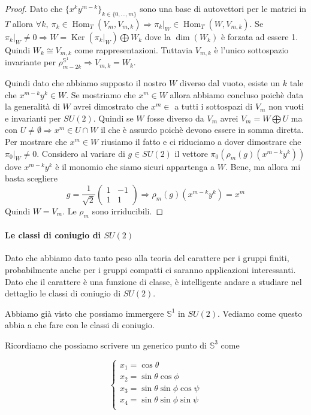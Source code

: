 \documentclass[11pt]{article}
\theoremstyle{plain}
\theoremstyle{definition}
\theoremstyle{remark}
\DeclareMathOperator{\Hom}{Hom}
\DeclareMathOperator{\Ker}{Ker}
\begin{document}
\begin{proof}
Dato che  $\{ x^ky^{m-k} \}_{k \in \{0, ..., m\}}$ sono una base di autovettori per le matrici in $T$ allora $\forall k,\ \pi_k\in \Hom_T(V_m,V_{m,k} )\Rightarrow \pi_k|_W\in \Hom_T(W,V_{m,k})$. Se $\pi_k|_W\neq 0\Rightarrow W=\Ker(\pi_k|_W)\bigoplus W_k$ dove la $\dim(W_k)$ è forzata ad essere 1. Quindi $W_k\cong V_{m,k}$ come rappresentazioni. Tuttavia $V_{m,k}$ è l'unico sottospazio invariante per $\rho_{m-2k}^{\mathbb{S}^1}\Rightarrow V_{m,k}=W_k$.


Quindi dato che abbiamo supposto il nostro $W$ diverso dal vuoto, esiste un $k$ tale che $x^{m-k}y^k\in W$. Se mostriamo che $x^m\in W$ allora abbiamo concluso poichè data la generalità di $W$ avrei dimostrato che $x^m\in$ a tutti i sottospazi di $V_m$ non vuoti e invarianti per $SU(2)$. Quindi se $W$ fosse diverso da $V_m$ avrei $V_m=W\bigoplus U$ ma con $U\neq \emptyset \Rightarrow x^m\in U\cap W$ il che è assurdo poichè devono essere in somma diretta. Per mostrare che $x^m\in W$ riusiamo il fatto e ci riduciamo a dover dimostrare che $\pi_0|_W\neq 0$. Considero al variare di $g\in SU(2)$ il vettore $\pi_0(\rho_m(g)(x^{m-k}y^k))$ dove $x^{m-k}y^k$ è il monomio che siamo sicuri appartenga a $W$. Bene, ma allora mi basta scegliere
\[g=\frac{1}{\sqrt{2}}\begin{pmatrix}
1& -1\\
 1& 1
\end{pmatrix}\Rightarrow \rho_m(g)(x^{m-k}y^k)=x^m\]
Quindi $W=V_m$. Le $\rho_m$ sono irriducibili.
\end{proof}




 \paragraph{Le classi di coniugio di $SU(2)$}
 Dato che abbiamo dato tanto peso alla teoria del carattere per i gruppi finiti, probabilmente anche per i gruppi compatti ci saranno applicazioni interessanti. Dato che il carattere è una funzione di classe, è intelligente andare a studiare nel dettaglio le classi di coniugio di $SU(2)$.


 Abbiamo già visto che possiamo immergere $\mathbb{S}^1$ in $SU(2)$. Vediamo come questo abbia a che fare con le classi di coniugio.


 Ricordiamo che possiamo scrivere un generico punto di $\mathbb{S}^3$ come

 \[
 \begin{cases}
 x_1 = \cos\theta \\
 x_2 = \sin\theta\cos\phi \\
 x_3 = \sin\theta\sin\phi\cos\psi \\
 x_4 = \sin\theta\sin\phi\sin\psi \\
 \end{cases}
 \]
\end{document}
